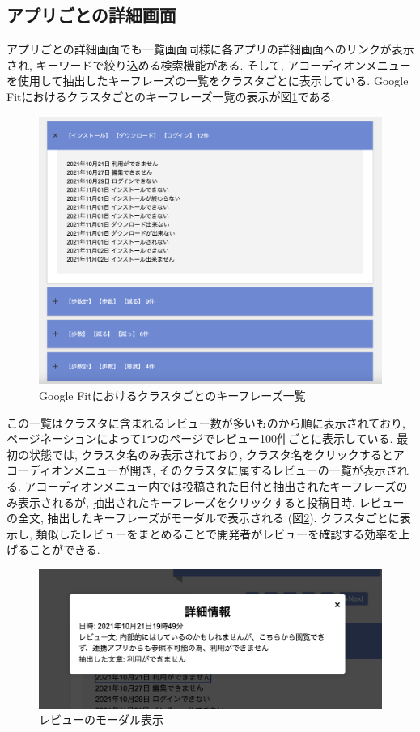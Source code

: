 \subsection{アプリごとの詳細画面}
アプリごとの詳細画面でも一覧画面同様に各アプリの詳細画面へのリンクが表示され, キーワードで絞り込める検索機能がある. 
そして, アコーディオンメニューを使用して抽出したキーフレーズの一覧をクラスタごとに表示している. 
Google Fitにおけるクラスタごとのキーフレーズ一覧の表示が図\ref{fig:review_items}である. 

\begin{figure}[H]
  \centering
  \includegraphics[scale=0.3]
    {contents/images/review_items.png}
  \caption{Google Fitにおけるクラスタごとのキーフレーズ一覧\label{fig:review_items}}
\end{figure}

\noindent
この一覧はクラスタに含まれるレビュー数が多いものから順に表示されており, ページネーションによって1つのページでレビュー100件ごとに表示している. 
最初の状態では, クラスタ名のみ表示されており, クラスタ名をクリックするとアコーディオンメニューが開き, そのクラスタに属するレビューの一覧が表示される. アコーディオンメニュー内では投稿された日付と抽出されたキーフレーズのみ表示されるが, 抽出されたキーフレーズをクリックすると投稿日時, レビューの全文, 抽出したキーフレーズがモーダルで表示される (図\ref{fig:modal}). 
クラスタごとに表示し, 類似したレビューをまとめることで開発者がレビューを確認する効率を上げることができる. 

\begin{figure}[H]
  \centering
  \includegraphics[scale=0.5]
    {contents/images/modal.png}
  \caption{レビューのモーダル表示\label{fig:modal}}
\end{figure}

